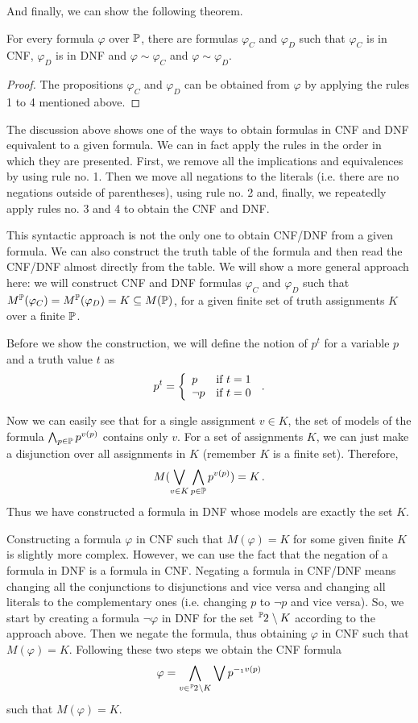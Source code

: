 And finally, we can show the following theorem. 

\begin{theorem}
For every formula $\varphi$ over $\mathbb{P}$, there are formulas $\varphi_C$ and $\varphi_D$ such that $\varphi_C$ is in CNF, $\varphi_D$ is in DNF and $\varphi \sim \varphi_C$ and $\varphi \sim \varphi_D$.
\end{theorem}
\begin{proof}
The propositions $\varphi_C$ and $\varphi_D$ can be obtained from $\varphi$ by applying the rules 1 to 4 mentioned above. 
\end{proof}

The discussion above shows one of the ways to obtain formulas in CNF and DNF equivalent to a given formula. We can in fact apply the rules in the order in which they are presented. First, we remove all the implications and equivalences by using rule no. 1. Then we move all negations to the literals (i.e. there are no negations outside of parentheses), using rule no. 2 and, finally, we repeatedly apply rules no. 3 and 4 to obtain the CNF and DNF. 

This syntactic approach is not the only one to obtain CNF/DNF from a given formula. We can also construct the truth table of the formula and then read the CNF/DNF almost directly from the table. We will show a more general approach here: we will construct CNF and DNF formulas $\varphi_C$ and $\varphi_D$ such that $M^\mathbb{P}(\varphi_C) = M^\mathbb{P}(\varphi_D) = K \subseteq M(\mathbb{P})$, for a given finite set of truth assignments $K$ over a finite $\mathbb{P}$.

Before we show the construction, we will define the notion of $p^t$ for a variable $p$ and a truth value $t$ as $$ p^t = \left\{ \begin{array}{ll} p & \text{if } t = 1 \\ \neg p & \text{if } t = 0 \end{array} \right.\,.$$ 

Now we can easily see that for a single assignment $v \in K$, the set of models of the formula $\bigwedge_{p \in \mathbb{P}} p^{v(p)}$ contains only $v$. For a set of assignments $K$, we can just make a disjunction over all assignments in $K$ (remember $K$ is a finite set). Therefore, $$M(\bigvee_{v \in K}\bigwedge_{p \in \mathbb{P}}p^{v(p)}) = K\,.$$ Thus we have constructed a formula in DNF whose models are exactly the set $K$. 

Constructing a formula $\varphi$ in CNF such that $M(\varphi) = K$ for some given finite $K$ is slightly more complex. However, we can use the fact that the negation of a formula in DNF is a formula in CNF. Negating a formula in CNF/DNF means changing all the conjunctions to disjunctions and vice versa and changing all literals to the complementary ones (i.e. changing $p$ to $\neg p$ and vice versa). So, we start by creating a formula $\neg \varphi$ in DNF for the set $\fset{\Prop}{2} \setminus K$ according to the approach above. Then we negate the formula, thus obtaining $\varphi$ in CNF such that $M(\varphi)=K$. Following these two steps we obtain the CNF formula $$\varphi = \Land_{v \in \fset{\Prop}{2} \setminus K}\Lor p^{-_1v(p)}$$ such that $M(\varphi) = K$.

